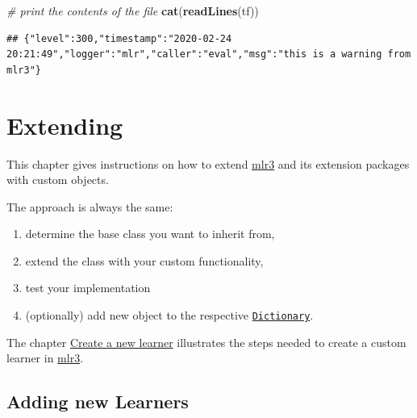 \documentclass[]{scrbook}
\newenvironment{Shaded}{\begin{snugshade}}{\end{snugshade}}
\newcommand{\CommentTok}[1]{\textcolor[rgb]{0.56,0.35,0.01}{\textit{#1}}}
\newcommand{\KeywordTok}[1]{\textcolor[rgb]{0.13,0.29,0.53}{\textbf{#1}}}
\newcommand{\NormalTok}[1]{#1}
\newcommand{\OperatorTok}[1]{\textcolor[rgb]{0.81,0.36,0.00}{\textbf{#1}}}
\newcommand{\StringTok}[1]{\textcolor[rgb]{0.31,0.60,0.02}{#1}}
\providecommand{\tightlist}{%
  \setlength{\itemsep}{0pt}\setlength{\parskip}{0pt}}
\renewenvironment{Shaded} {\begin{snugshade}\small} {\end{snugshade}}
\begin{document}
\begin{Shaded}
\begin{Highlighting}[]
\CommentTok{# print the contents of the file}
\KeywordTok{cat}\NormalTok{(}\KeywordTok{readLines}\NormalTok{(tf))}
\end{Highlighting}
\end{Shaded}

\begin{verbatim}
## {"level":300,"timestamp":"2020-02-24 20:21:49","logger":"mlr","caller":"eval","msg":"this is a warning from mlr3"}
\end{verbatim}

\begin{Shaded}
\end{Shaded}

\hypertarget{extending}{%
\chapter{Extending}\label{extending}}

This chapter gives instructions on how to extend \href{https://mlr3.mlr-org.com}{mlr3} and its extension packages with custom objects.

The approach is always the same:

\begin{enumerate}
\def\labelenumi{\arabic{enumi}.}
\tightlist
\item
  determine the base class you want to inherit from,
\item
  extend the class with your custom functionality,
\item
  test your implementation
\item
  (optionally) add new object to the respective \href{https://mlr3misc.mlr-org.com/reference/Dictionary.html}{\texttt{Dictionary}}.
\end{enumerate}

The chapter \protect\hyperlink{extending-learners}{Create a new learner} illustrates the steps needed to create a custom learner in \href{https://mlr3.mlr-org.com}{mlr3}.

\hypertarget{extending-learners}{%
\section{Adding new Learners}\label{extending-learners}}
\end{document}
